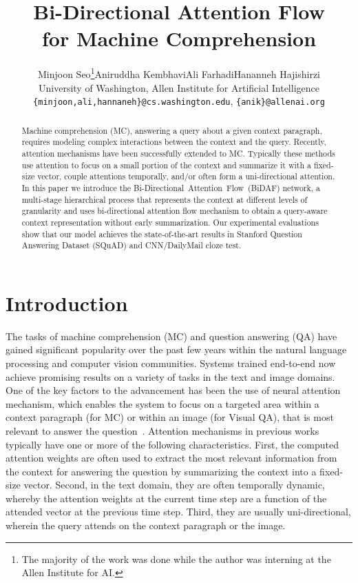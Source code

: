 \documentclass{article} \usepackage{iclr2017_conference,times}
\title{Bi-Directional Attention Flow \\
for Machine Comprehension}
\author{Minjoon Seo\thanks{The majority of the work was done while the author was interning at the Allen Institute for AI.}\qquad Aniruddha Kembhavi\qquad Ali Farhadi\qquad Hananneh Hajishirzi \\
University of Washington, Allen Institute for Artificial Intelligence\\
\texttt{\{minjoon,ali,hannaneh\}@cs.washington.edu}, \texttt{\{anik\}@allenai.org}\\
}
\newcommand{\sys}{\mbox{Bi-Directional Attention Flow}}
\newcommand{\sysshort}{\mbox{\sc BiDAF}}
\begin{document}
\maketitle

\begin{abstract}
Machine comprehension (MC), answering a query about a given context paragraph, requires modeling complex interactions between the context and the query. Recently, attention mechanisms have been successfully extended to MC. Typically these methods use attention to focus on a small portion of the context and summarize it with a fixed-size vector, couple attentions temporally, and/or often form a uni-directional attention. 
In this paper we introduce the \sys\ (\sysshort) network, a multi-stage hierarchical process that represents the context at different levels of granularity and uses bi-directional attention flow mechanism to obtain a query-aware context representation without early summarization. 
Our experimental evaluations show that our  model achieves the state-of-the-art results in Stanford Question Answering Dataset (SQuAD) and CNN/DailyMail cloze test. 

\end{abstract}

\section{Introduction}\label{sec:intro}
The tasks of machine comprehension (MC) and question answering (QA) have gained significant popularity over the past few years within the natural language processing and computer vision communities. Systems trained end-to-end now achieve promising results on a variety of tasks in the text and image domains. 
One of the key factors to the advancement has been the use of neural attention mechanism, which enables the system to focus on a targeted area within a context paragraph (for MC) or within an image (for Visual QA), that is most relevant to answer the question~\citep{memnn,antol2015vqa,xiong2016dynamic}. 
Attention mechanisms in previous works typically have one or more of the following characteristics. 
First, the computed attention weights are often used to extract the most relevant information from the context for answering the question by summarizing the context into a fixed-size vector.
Second, in the text domain, they are often temporally dynamic, whereby the attention weights at the current time step are a function of the attended vector at the previous time step. 
Third, they are usually uni-directional, wherein the query attends on the context paragraph or the image. 
\end{document}
